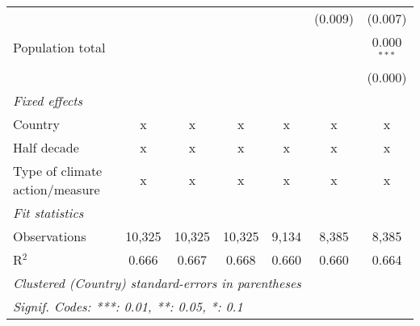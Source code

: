 \begin{tabular}{lcccccc}
                                                                              &         &                &                &                & (0.009)        & (0.007)\\   
   Population total                                                           &         &                &                &                &                & 0.000$^{***}$\\   
                                                                              &         &                &                &                &                & (0.000)\\   
   \emph{Fixed effects}\\
   Country                                                                    & x       & x              & x              & x              & x              & x\\  
   Half decade                                                                & x       & x              & x              & x              & x              & x\\  
   Type of climate action/measure                                             & x       & x              & x              & x              & x              & x\\  
   \midrule \emph{Fit statistics}\\
   Observations                                                               & 10,325  & 10,325         & 10,325         & 9,134          & 8,385          & 8,385\\  
   R$^2$                                                                      & 0.666   & 0.667          & 0.668          & 0.660          & 0.660          & 0.664\\  
   \midrule
   \multicolumn{7}{l}{\emph{Clustered (Country) standard-errors in parentheses}}\\
   \multicolumn{7}{l}{\emph{Signif. Codes: ***: 0.01, **: 0.05, *: 0.1}}\\
\end{tabular}
\par\endgroup



